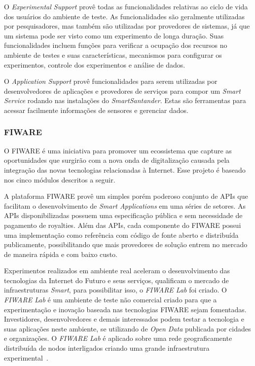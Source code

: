 O \textit{Experimental Support} provê todas as funcionalidades relativas ao ciclo de vida dos usuários
do ambiente de teste. As funcionalidades são geralmente utilizadas por pesquisadores, mas também são utilizadas por
provedores de sistemas, já que um sistema pode ser visto como um experimento de longa duração.
Suas funcionalidades incluem funções para verificar a ocupação dos recursos no ambiente de testes e suas características,
mecanismos para configurar os experimentos, controle dos experimentos e análise de dados.

O \textit{Application Support} provê funcionalidades para serem utilizadas por desenvolvedores de aplicações
e provedores de serviços para compor um \textit{Smart Service} rodando nas instalações do \textit{SmartSantander}.
Estas são ferramentas para acessar facilmente informações de sensores e gerenciar dados.

\subsubsection{FIWARE}
O FIWARE é uma iniciativa para promover um ecossistema que capture as oportunidades que surgirão com a nova onda
de digitalização causada pela integração das novas tecnologias relacionadas à Internet. Esse projeto é
baseado nos cinco módulos descritos a seguir.

A plataforma FIWARE provê um simples porém poderoso conjunto de APIs que facilitam o desenvolvimento de \textit{Smart Applications}
em uma séries de setores. As APIs disponibilizadas possuem uma especificação pública e sem necessidade de pagamento de royalties.
Além das APIs, cada componente do FIWARE possui uma implementação como referência com código de fonte aberto e distribuída
publicamente, possibilitando que mais provedores de solução entrem no mercado de maneira rápida e com baixo custo.

Experimentos realizados em ambiente real aceleram o desenvolvimento das tecnologias da Internet do Futuro e seus serviços,
qualificam o mercado de infraestruturas \textit{Smart}, para possibilitar isso, o \textit{FIWARE Lab} foi criado.
O \textit{FIWARE Lab} é um ambiente de teste não comercial criado para que a experimentação e inovação baseada nas tecnologias
FIWARE sejam fomentadas. Investidores, desenvolvedores e demais interessados podem testar a tecnologia e suas aplicações neste
ambiente, se utilizando de \textit{Open Data} publicada por cidades e organizações. O \textit{FIWARE Lab} é aplicado sobre
uma rede geograficamente distribuída de nodos interligados criando uma grande infraestrutura experimental~\cite{7027596}.

